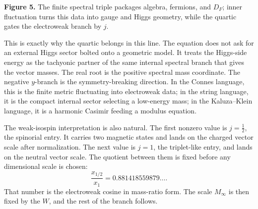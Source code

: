 \documentclass[11pt]{article}
\begin{document}
\begin{center}

\textbf{Figure 5.} The finite spectral triple packages algebra, fermions, and \(D_F\); inner fluctuation turns this data into gauge and Higgs geometry, while the quartic gates the electroweak branch by \(j\).
\end{center}

This is exactly why the quartic belongs in this line. The equation does not ask for an external Higgs sector bolted onto a geometric model. It treats the Higgs-side energy as the tachyonic partner of the same internal spectral branch that gives the vector masses. The real root is the positive spectral mass coordinate. The negative \(y\)-branch is the symmetry-breaking direction. In the Connes language, this is the finite metric fluctuating into electroweak data; in the string language, it is the compact internal sector selecting a low-energy mass; in the Kaluza--Klein language, it is a harmonic Casimir feeding a modulus equation.

The weak-isospin interpretation is also natural. The first nonzero value is \(j=\frac12\), the spinorial entry. It carries two magnetic states and lands on the charged vector scale after normalization. The next value is \(j=1\), the triplet-like entry, and lands on the neutral vector scale. The quotient between them is fixed before any dimensional scale is chosen:
\[
        \frac{x_{1/2}}{x_1}=0.881418559879\ldots .
\]
That number is the electroweak cosine in mass-ratio form. The scale \(M_\infty\) is then fixed by the \(W\), and the rest of the branch follows.
\end{document}
